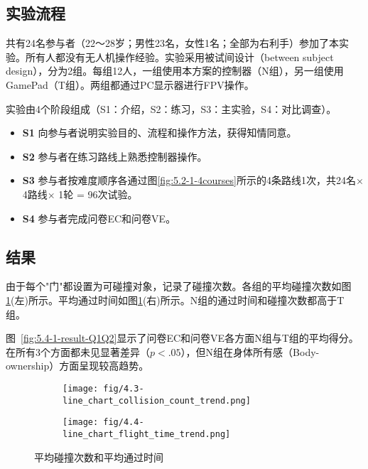 \subsection{实验流程}
共有24名参与者（22～28岁；男性23名，女性1名；全部为右利手）参加了本实验。所有人都没有无人机操作经验。实验采用被试间设计（between subject design），分为2组。每组12人，一组使用本方案的控制器（N组），另一组使用GamePad（T组）。两组都通过PC显示器进行FPV操作。

实验由4个阶段组成（S1：介绍，S2：练习，S3：主实验，S4：对比调查）。

\begin{itemize}
    \item \textbf{S1} 向参与者说明实验目的、流程和操作方法，获得知情同意。
    \item \textbf{S2} 参与者在练习路线上熟悉控制器操作。
    \item \textbf{S3} 参与者按难度顺序各通过图\ref{fig:5.2-1-4courses}所示的4条路线1次，共24名$\times$ 4路线$\times$ 1轮 = 96次试验。
    \item \textbf{S4} 参与者完成问卷EC和问卷VE。
\end{itemize}


\subsection{结果}\label{study1_result}

由于每个"门"都设置为可碰撞对象，记录了碰撞次数。各组的平均碰撞次数如图\ref{fig:5.4-1-exp1_time_and_collision}(左)所示。平均通过时间如图\ref{fig:5.4-1-exp1_time_and_collision}(右)所示。N组的通过时间和碰撞次数都高于T组。

图~\ref{fig:5.4-1-result-Q1Q2}显示了问卷EC和问卷VE各方面N组与T组的平均得分。在所有3个方面都未见显著差异（$p<.05$），但N组在身体所有感（Body-ownership）方面呈现较高趋势。

\begin{figure}[t]
    \centering
    \begin{subfigure}[b]{0.48\textwidth}
        \texttt{[image: fig/4.3-line\_chart\_collision\_count\_trend.png]}
    \end{subfigure}
    \begin{subfigure}[b]{0.48\textwidth}
        \texttt{[image: fig/4.4-line\_chart\_flight\_time\_trend.png]}
    \end{subfigure}
    \caption{\label{fig:5.4-1-exp1_time_and_collision}平均碰撞次数和平均通过时间}
\end{figure}

